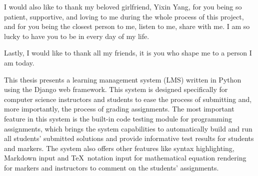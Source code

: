 \medskip

I would also like to thank my beloved girlfriend, Yixin Yang,
for you being so patient, supportive, and loving to me during the whole process
of this project, 
and for you being the closest person to me, listen to me, share with me.
I am so lucky to have you to be in every day of my life.

\medskip

Lastly, I would like to thank all my friends, it is you who shape me to a person
I am today.



\tocAndSuch



This thesis presents a learning management system (LMS) written in Python using
the Django web framework. This system is designed specifically for computer
science instructors and students to ease the process of submitting and,
more importantly, the process of grading assignments. 
The most important feature in this system is the built-in code
testing module for programming assignments, which brings the system capabilities
to automatically build and run all students'
submitted solutions and provide informative test results for students and
markers.
The system also offers other features like syntax highlighting, Markdown input
and \TeX\ notation input for mathematical equation rendering for
markers and instructors to comment on the students' assignments.



\afterpreface
